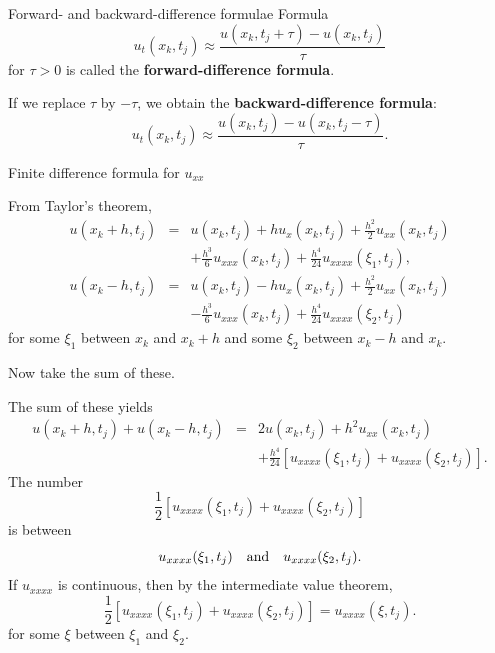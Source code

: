 \documentclass{beamer}
\begin{document}


\begin{frame}{Forward- and backward-difference formulae}
Formula
\[
u_{t}(x_k,t_j)\approx \frac{u(x_k,t_j+\tau)-u(x_k,t_j)}{\tau}
\]
for $\tau>0$ is called the {\bf forward-difference formula}.

\vskip 5mm
If we replace $\tau$ by $-\tau$, we obtain
the {\bf backward-difference formula}:
\[
u_{t}(x_k,t_j)\approx \frac{u(x_k,t_j)-u(x_k,t_j-\tau)}{\tau}.
\]


\end{frame}



\begin{frame}{Finite difference formula for $u_{xx}$}

From Taylor's theorem,
\begin{eqnarray}
u(x_k+h,t_j)&=&u(x_k,t_j)+h u_{x}(x_k,t_j)+
\frac{h^2}{2}u_{xx}(x_k,t_j) \nonumber \\
&&+
\frac{h^3}{6}u_{xxx}(x_k,t_{j})+
\frac{h^4}{24}u_{xxxx}(\xi_1,t_{j}), \nonumber \\
u(x_k-h,t_j)&=&u(x_k,t_j)-h u_{x}(x_k,t_j)+
\frac{h^2}{2}u_{xx}(x_k,t_j) \nonumber \\
&&-
\frac{h^3}{6}u_{xxx}(x_k,t_{j})+
\frac{h^4}{24}u_{xxxx}(\xi_2,t_{j}) \nonumber
\end{eqnarray}
for some $\xi_{1}$ between $x_{k}$ and $x_{k}+h$
and some $\xi_{2}$ between $x_{k}-h$ and $x_{k}$.

Now take the sum of these.

\end{frame}



\begin{frame}{}
The sum of these yields
\begin{eqnarray}
u(x_k+h,t_j)+u(x_k-h,t_j)&=&2u(x_k,t_j)+ h^2u_{xx}(x_k,t_j) \nonumber \\
&&+ \frac{h^4}{24}\left[u_{xxxx}(\xi_1,t_{j}) +
u_{xxxx}(\xi_2,t_{j})\right].  \nonumber
\end{eqnarray}
The number
\[
\frac{1}{2}\left[u_{xxxx}(\xi_{1}, t_{j})+u_{xxxx}(\xi_{2},t_{j})\right]
\]
is between
\[
u_{xxxx}(\xi_{1},t_{j}) \quad {\rm and} \quad u_{xxxx}(\xi_{2},t_{j}).
\]
If $u_{xxxx}$ is continuous, then
by the intermediate value theorem,
\[
\frac{1}{2}\left[u_{xxxx}(\xi_{1},t_{j})+u_{xxxx}(\xi_{2},t_{j})\right]
=u_{xxxx}(\xi,t_{j}).
\]
for some $\xi$ between $\xi_{1}$ and $\xi_{2}$.





\end{frame}
\end{document}
